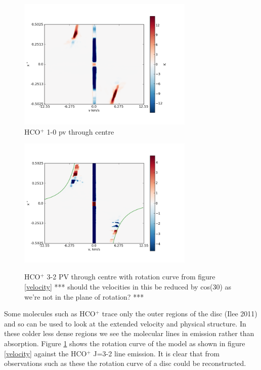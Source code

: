 \documentclass[useAMS,usenatbib]{mn2e}
\begin{document}
\begin{figure}
 \includegraphics[width=84mm]{Figures/sim/imageHCOp_1-0_30deg_PV_centre.png}

 \caption{HCO$^+$ 1-0 pv through centre}
\end{figure}

\begin{figure}
 \includegraphics[width=84mm]{Figures/sim/imageHCOp_3-2_30deg_PV_centre_2.png}
 \label{hcop_pv}
 \caption{HCO$^+$ 3-2 PV through centre with rotation curve from figure \ref{velocity} *** should the velocities in this be reduced by cos(30) as we're not in the plane of rotation? ***}
\end{figure}

Some molecules such as HCO$^+$ trace only the outer regions of the disc (Ilee 2011) and so can be used to look at the extended velocity and physical structure. In these colder less dense regions we see the molecular lines in emission rather than absorption. Figure \ref{hcop_pv} shows the rotation curve of the model as shown in figure \ref{velocity} against the HCO$^+$ J=3-2 line emission. It is clear that from observations such as these the rotation curve of a disc could be reconstructed.\newline
\newline \newline
\end{document}
